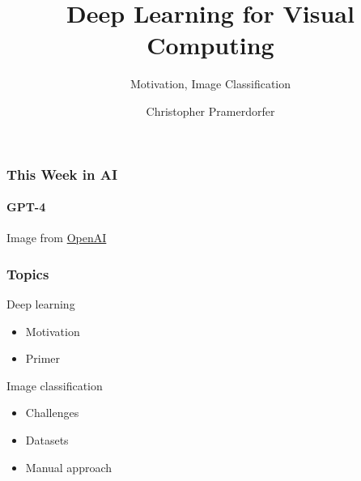 \documentclass[xetex,professionalfont]{beamer}
\title{Deep Learning for Visual Computing}
\subtitle{Motivation, Image Classification}
\author{Christopher Pramerdorfer}
\institute{Computer Vision Lab, TU Wien}
\begin{document}
\begin{frame}
\maketitle
\end{frame}


\begin{frame}
\frametitle{This Week in AI}
\framesubtitle{GPT-4}

\begin{center}
  {\centering Image from \href{https://chat.openai.com/chat}{OpenAI}}
\end{center}

\end{frame}


\begin{frame}
\frametitle{Topics}

Deep learning
\begin{itemize}
    \item Motivation
    \item Primer
\end{itemize}

\bigskip

Image classification
\begin{itemize}
    \item Challenges
    \item Datasets
    \item Manual approach
\end{itemize}

\end{frame}
\end{document}
